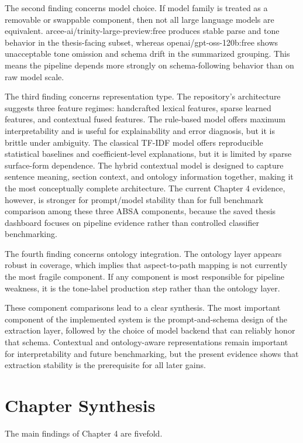 The second finding concerns model choice. If model family is treated as a removable or swappable component, then not all large language models are equivalent. arcee-ai/trinity-large-preview:free produces stable parse and tone behavior in the thesis-facing subset, whereas openai/gpt-oss-120b:free shows unacceptable tone omission and schema drift in the summarized grouping. This means the pipeline depends more strongly on schema-following behavior than on raw model scale.

The third finding concerns representation type. The repository’s architecture suggests three feature regimes: handcrafted lexical features, sparse learned features, and contextual fused features. The rule-based model offers maximum interpretability and is useful for explainability and error diagnosis, but it is brittle under ambiguity. The classical TF-IDF model offers reproducible statistical baselines and coefficient-level explanations, but it is limited by sparse surface-form dependence. The hybrid contextual model is designed to capture sentence meaning, section context, and ontology information together, making it the most conceptually complete architecture. The current Chapter 4 evidence, however, is stronger for prompt/model stability than for full benchmark comparison among these three ABSA components, because the saved thesis dashboard focuses on pipeline evidence rather than controlled classifier benchmarking.

The fourth finding concerns ontology integration. The ontology layer appears robust in coverage, which implies that aspect-to-path mapping is not currently the most fragile component. If any component is most responsible for pipeline weakness, it is the tone-label production step rather than the ontology layer.

These component comparisons lead to a clear synthesis. The most important component of the implemented system is the prompt-and-schema design of the extraction layer, followed by the choice of model backend that can reliably honor that schema. Contextual and ontology-aware representations remain important for interpretability and future benchmarking, but the present evidence shows that extraction stability is the prerequisite for all later gains.
\section{Chapter Synthesis}

The main findings of Chapter 4 are fivefold.

